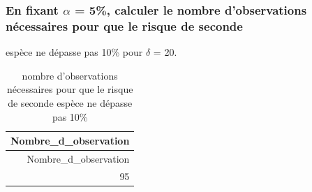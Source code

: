 \documentclass[
]{article}
\newenvironment{Shaded}{\begin{snugshade}}{\end{snugshade}}
\newcommand{\AttributeTok}[1]{\textcolor[rgb]{0.77,0.63,0.00}{#1}}
\newcommand{\CommentTok}[1]{\textcolor[rgb]{0.56,0.35,0.01}{\textit{#1}}}
\newcommand{\DecValTok}[1]{\textcolor[rgb]{0.00,0.00,0.81}{#1}}
\newcommand{\FloatTok}[1]{\textcolor[rgb]{0.00,0.00,0.81}{#1}}
\newcommand{\FunctionTok}[1]{\textcolor[rgb]{0.00,0.00,0.00}{#1}}
\newcommand{\NormalTok}[1]{#1}
\newcommand{\OtherTok}[1]{\textcolor[rgb]{0.56,0.35,0.01}{#1}}
\newcommand{\SpecialCharTok}[1]{\textcolor[rgb]{0.00,0.00,0.00}{#1}}
\newcommand{\StringTok}[1]{\textcolor[rgb]{0.31,0.60,0.02}{#1}}
\begin{document}
\hypertarget{en-fixant-alpha-5-calculer-le-nombre-dobservations-nuxe9cessaires-pour-que-le-risque-de-seconde}{%
\subsubsection{\texorpdfstring{En fixant \(\alpha\) = 5\%, calculer le
nombre d'observations nécessaires pour que le risque de
seconde}{En fixant \textbackslash alpha = 5\%, calculer le nombre d'observations nécessaires pour que le risque de seconde}}\label{en-fixant-alpha-5-calculer-le-nombre-dobservations-nuxe9cessaires-pour-que-le-risque-de-seconde}}

espèce ne dépasse pas 10\% pour \(\delta\) = 20.

\begin{Shaded}
\end{Shaded}

\begin{longtable}[]{@{}r@{}}
\caption{nombre d'observations nécessaires pour que le risque de seconde
espèce ne dépasse pas 10\%}\tabularnewline
\toprule()
Nombre\_d\_observation \\
\midrule()
\endfirsthead
\toprule()
Nombre\_d\_observation \\
\midrule()
\endhead
95 \\
\bottomrule()
\end{longtable}
\end{document}
